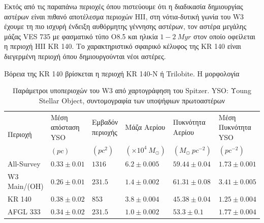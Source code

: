 \documentclass[a4paper,12pt]{memoir}
\newcommand{\e}[1]{\times 10^{#1}}
\begin{document}
Εκτός από τις παραπάνω περιοχές όπου πιστεύουμε ότι η διαδικασία δημιουργίας αστέρων είναι πιθανό αποτέλεσμα περιοχών HII, στη νότια-δυτική γωνία του W3 έχουμε τη πιο ισχυρή ένδειξη αυθόρμητης γέννησης αστέρων, τον αστέρα μεγάλης μάζας VES 735 με φασματικό τύπο O8.5 και ηλικία $1-2 \ Myr$ στον οποίο οφείλεται η περιοχή HII KR 140. Το χαρακτηριστικό σφαιρικό κέλυφος της KR 140 είναι διεγερμένη περιοχή όπου δημιουργούνται νέοι αστέρες. 

Βόρεια της KR 140 βρίσκεται η περιοχή KR 140-N ή Trilobite. Η μορφολογία 


\begin{table}
	\caption{Παράμετροι υποπεριοχών του W3 από χαρτογράφηση του Spitzer. YSO: Υoung Stellar Object, συντομογραφία των υποψήφιων πρωτοαστέρων}
	\begin{tabular}{p{} p{2.5cm} p{1.5cm} p{2cm} p{2.2cm} p{2.5cm}}
		\toprule
		\multirow{2}{*}{Περιοχή} & Μέση απόσταση YSO & Εμβαδόν περιοχής & Μάζα Αερίου & Πυκνότητα Αερίου & Μέση Πυκνότητα YSO \\ 
		&  $(pc)$ & $(pc^2)$ & $(\e{4} \ M_{\odot})$ & $(M_{\odot} \ pc^{-2})$ & $ (pc^{-2}) $ \\
		\midrule
		All-Survey & $0.33 \pm 0.01$ & $1316$ & $6.2\pm0.005$ & $59.44\pm 0.04$ & $1.73\pm 0.001$ \\
	  W3 Main/(OH) & $0.26 \pm 0.01$ & $231.5$ & $1.4\pm0.002$ & $61.31\pm 0.08$ & $3.41\pm 0.005$ \\
	  KR 140 & $0.38 \pm 0.02$ & $853$ & $3.8\pm0.004$ & $45.38\pm 0.04$ & $1.25\pm 0.004$ \\
	  AFGL 333 & $0.34 \pm 0.02$ & $231.5$ & $1.0\pm0.002$ & $53.3\pm 0.1$ & $1.77\pm 0.004$ \\  
		\bottomrule		
	\end{tabular}
\end{table}
\end{document}
